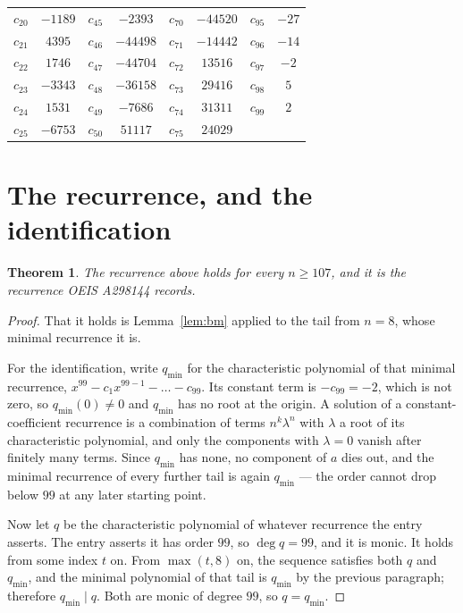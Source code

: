 \documentclass[11pt,a4paper]{article}
\theoremstyle{plain}
\newtheorem{theorem}{Theorem}
\theoremstyle{definition}
\begin{document}
\begin{center}
\begin{tabular}{cccccccc}
$c_{20}$ & $-1189$ & $c_{45}$ & $-2393$ & $c_{70}$ & $-44520$ & $c_{95}$ & $-27$ \\
$c_{21}$ & $4395$ & $c_{46}$ & $-44498$ & $c_{71}$ & $-14442$ & $c_{96}$ & $-14$ \\
$c_{22}$ & $1746$ & $c_{47}$ & $-44704$ & $c_{72}$ & $13516$ & $c_{97}$ & $-2$ \\
$c_{23}$ & $-3343$ & $c_{48}$ & $-36158$ & $c_{73}$ & $29416$ & $c_{98}$ & $5$ \\
$c_{24}$ & $1531$ & $c_{49}$ & $-7686$ & $c_{74}$ & $31311$ & $c_{99}$ & $2$ \\
$c_{25}$ & $-6753$ & $c_{50}$ & $51117$ & $c_{75}$ & $24029$ &  &  \\
\end{tabular}
\end{center}

\section{The recurrence, and the identification}

\begin{theorem}
The recurrence above holds for every $n\ge107$, and it is the recurrence OEIS A298144 records.
\end{theorem}

\begin{proof}
That it holds is Lemma~\ref{lem:bm} applied to the tail from $n=8$, whose minimal
recurrence it is.

For the identification, write $q_{\min}$ for the characteristic polynomial of that minimal
recurrence, $x^{99}-c_1x^{99-1}-\dots-c_{99}$. Its constant term is
$-c_{99}=-2$, which is not zero, so $q_{\min}(0)\neq0$ and $q_{\min}$ has no
root at the origin. A solution of a constant-coefficient recurrence is a combination of terms
$n^{k}\lambda^{n}$ with $\lambda$ a root of its characteristic polynomial, and only the
components with $\lambda=0$ vanish after finitely many terms. Since $q_{\min}$ has none, no
component of $a$ dies out, and the minimal recurrence of every further tail is again
$q_{\min}$ --- the order cannot drop below $99$ at any later starting point.

Now let $q$ be the characteristic polynomial of whatever recurrence the entry asserts. The
entry asserts it has order $99$, so $\deg q=99$, and it is monic. It holds from some
index $t$ on. From $\max(t,8)$ on, the sequence satisfies both $q$ and $q_{\min}$, and
the minimal polynomial of that tail is $q_{\min}$ by the previous paragraph; therefore
$q_{\min}\mid q$. Both are monic of degree $99$, so $q=q_{\min}$.
\end{proof}
\end{document}
